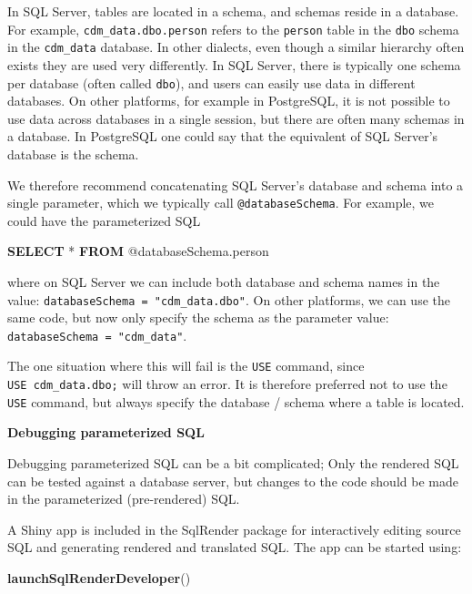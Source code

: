 \documentclass[11pt]{book}
\newenvironment{Shaded}{\begin{snugshade}}{\end{snugshade}}
\newcommand{\KeywordTok}[1]{\textcolor[rgb]{0.13,0.29,0.53}{\textbf{#1}}}
\newcommand{\NormalTok}[1]{#1}
\begin{document}
In SQL Server, tables are located in a schema, and schemas reside in a
database. For example, \texttt{cdm\_data.dbo.person} refers to the
\texttt{person} table in the \texttt{dbo} schema in the
\texttt{cdm\_data} database. In other dialects, even though a similar
hierarchy often exists they are used very differently. In SQL Server,
there is typically one schema per database (often called \texttt{dbo}),
and users can easily use data in different databases. On other
platforms, for example in PostgreSQL, it is not possible to use data
across databases in a single session, but there are often many schemas
in a database. In PostgreSQL one could say that the equivalent of SQL
Server's database is the schema.

We therefore recommend concatenating SQL Server's database and schema
into a single parameter, which we typically call
\texttt{@databaseSchema}. For example, we could have the parameterized
SQL

\begin{Shaded}
\begin{Highlighting}[]
\KeywordTok{SELECT}\NormalTok{ * }\KeywordTok{FROM}\NormalTok{ @databaseSchema.person}
\end{Highlighting}
\end{Shaded}

where on SQL Server we can include both database and schema names in the
value: \texttt{databaseSchema\ =\ "cdm\_data.dbo"}. On other platforms,
we can use the same code, but now only specify the schema as the
parameter value: \texttt{databaseSchema\ =\ "cdm\_data"}.

The one situation where this will fail is the \texttt{USE} command,
since \texttt{USE\ cdm\_data.dbo;} will throw an error. It is therefore
preferred not to use the \texttt{USE} command, but always specify the
database / schema where a table is located.

\textbf{Debugging parameterized SQL}

Debugging parameterized SQL can be a bit complicated; Only the rendered
SQL can be tested against a database server, but changes to the code
should be made in the parameterized (pre-rendered) SQL.

A Shiny app is included in the SqlRender package for interactively
editing source SQL and generating rendered and translated SQL. The app
can be started using:

\begin{Shaded}
\begin{Highlighting}[]
\KeywordTok{launchSqlRenderDeveloper}\NormalTok{()}
\end{Highlighting}
\end{Shaded}
\end{document}

